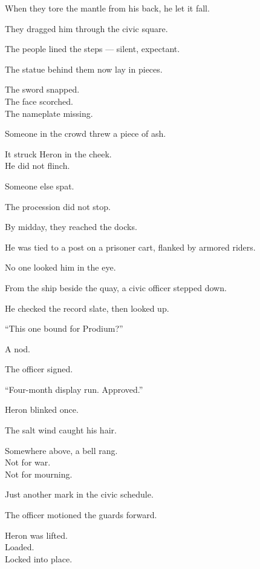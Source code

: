 \documentclass[9pt]{article}
\begin{document}
When they tore the mantle from his back, he let it fall.

\vspace{1em}

They dragged him through the civic square.

The people lined the steps — silent, expectant.

The statue behind them now lay in pieces.

The sword snapped.\\
The face scorched.\\
The nameplate missing.

Someone in the crowd threw a piece of ash.

It struck Heron in the cheek.\\
He did not flinch.

Someone else spat.

The procession did not stop.

\vspace{1em}

By midday, they reached the docks.

He was tied to a post on a prisoner cart, flanked by armored riders.

No one looked him in the eye.

\vspace{1em}

From the ship beside the quay, a civic officer stepped down.

He checked the record slate, then looked up.

“This one bound for Prodium?”

A nod.

The officer signed.

“Four-month display run. Approved.”

\vspace{1em}

Heron blinked once.

The salt wind caught his hair.

Somewhere above, a bell rang.\\
Not for war.\\
Not for mourning.

Just another mark in the civic schedule.

\vspace{1em}

The officer motioned the guards forward.

Heron was lifted.\\
Loaded.\\
Locked into place.
\end{document}
